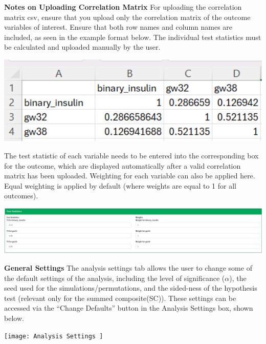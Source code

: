 \documentclass[
]{article}
\begin{document}
\textbf{Notes on Uploading Correlation Matrix} For uploading the
correlation matrix csv, ensure that you upload only the correlation
matrix of the outcome variables of interest. Ensure that both row names
and column names are included, as seen in the example format below. The
individual test statistics must be calculated and uploaded manually by
the user.

\begin{center}\includegraphics[width=5.93in]{Example Correlation Matrix} \end{center}

The test statistic of each variable needs to be entered into the
corresponding box for the outcome, which are displayed automatically
after a valid correlation matrix has been uploaded. Weighting for each
variable can also be applied here. Equal weighting is applied by default
(where weights are equal to 1 for all outcomes).

\begin{center}\includegraphics[width=22.74in]{SC-QC Tutorial CMTS Weights and TS} \end{center}

\textbf{General Settings} The analysis settings tab allows the user to
change some of the default settings of the analysis, including the level
of significance (\(\alpha\)), the seed used for the
simulations/permutations, and the sided-ness of the hypothesis test
(relevant only for the summed composite(SC)). These settings can be
accessed via the ``Change Defaults'' button in the Analysis Settings
box, shown below.

\begin{center}\texttt{[image: Analysis Settings ]} \end{center}
\end{document}

